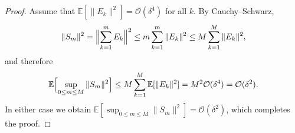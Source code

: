 \documentclass[10pt,a4paper]{amsart}
\newcommand{\E}{\mathbb{E}}
\begin{document}
\begin{proof}
Assume that $\E[\|E_k\|^{2}] = \mathcal O(\delta^{4})$ for all $k$.
By Cauchy–Schwarz,
\[
    \|S_m\|^{2}
    =
    \Bigl\|\sum_{k=1}^{m}E_k\Bigr\|^{2}
    \le
    m\sum_{k=1}^{m}\|E_k\|^{2}
    \le
    M\sum_{k=1}^{M}\|E_k\|^{2},
\]
and therefore
\[
    \E\Bigl[\sup_{0\le m\le M}\|S_m\|^{2}\Bigr]
    \le
    M\sum_{k=1}^{M}\E[\|E_k\|^{2}]
    =
    M^{2}\mathcal O(\delta^{4})
    =
    \mathcal O(\delta^{2}).
\]
In either case we obtain  
$\E[\sup_{0\le m\le M}\|S_m\|^{2}] = \mathcal O(\delta^{2})$,  
which completes the proof.
\end{proof}
\end{document}
